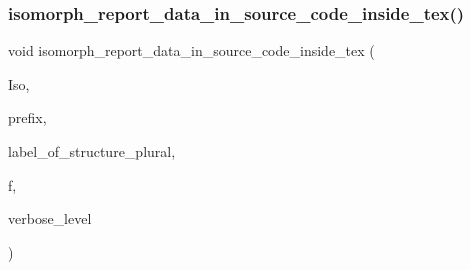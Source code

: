\subsubsection{\texorpdfstring{isomorph\+\_\+report\+\_\+data\+\_\+in\+\_\+source\+\_\+code\+\_\+inside\+\_\+tex()}{isomorph\_report\_data\_in\_source\_code\_inside\_tex()}}
{\footnotesize\ttfamily void isomorph\+\_\+report\+\_\+data\+\_\+in\+\_\+source\+\_\+code\+\_\+inside\+\_\+tex (\begin{DoxyParamCaption}\item[{\mbox{\hyperlink{classisomorph}{isomorph}} \&}]{Iso,  }\item[{const \mbox{\hyperlink{galois_8h_ab6cc7b4aeb6ea31aba2b3fbfc83ff5e6}{B\+Y\+TE}} $\ast$}]{prefix,  }\item[{\mbox{\hyperlink{galois_8h_ab6cc7b4aeb6ea31aba2b3fbfc83ff5e6}{B\+Y\+TE}} $\ast$}]{label\+\_\+of\+\_\+structure\+\_\+plural,  }\item[{ostream \&}]{f,  }\item[{\mbox{\hyperlink{galois_8h_a09fddde158a3a20bd2dcadb609de11dc}{I\+NT}}}]{verbose\+\_\+level }\end{DoxyParamCaption})}

\mbox{\label{isomorph__global_8_c_a70fc252cacf037d9d20b1455671cd1d0}} 
